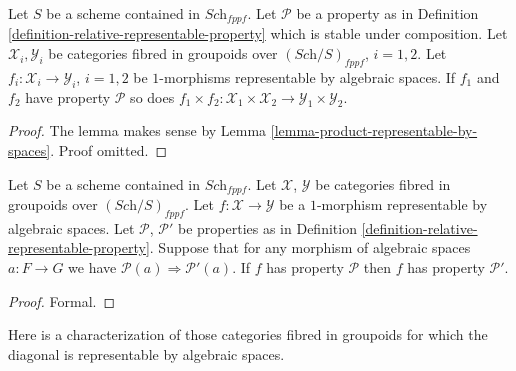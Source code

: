 \begin{lemma}
\label{lemma-product-representable-transformations-property}
Let $S$ be a scheme contained in $\textit{Sch}_{fppf}$.
Let $\mathcal{P}$ be a property as in
Definition \ref{definition-relative-representable-property}
which is stable under composition.
Let $\mathcal{X}_i, \mathcal{Y}_i$ be categories fibred in groupoids over
$(\textit{Sch}/S)_{fppf}$, $i = 1, 2$.
Let $f_i : \mathcal{X}_i \to \mathcal{Y}_i$, $i = 1, 2$
be $1$-morphisms representable by algebraic spaces.
If $f_1$ and $f_2$ have property $\mathcal{P}$ so does
$
f_1 \times f_2 :
\mathcal{X}_1 \times \mathcal{X}_2
\to
\mathcal{Y}_1 \times \mathcal{Y}_2
$.
\end{lemma}

\begin{proof}
The lemma makes sense by
Lemma \ref{lemma-product-representable-by-spaces}.
Proof omitted.
\end{proof}

\begin{lemma}
\label{lemma-representable-transformations-property-implication}
Let $S$ be a scheme contained in $\textit{Sch}_{fppf}$.
Let $\mathcal{X}$, $\mathcal{Y}$ be categories fibred in groupoids
over $(\textit{Sch}/S)_{fppf}$.
Let $f : \mathcal{X} \to \mathcal{Y}$ be a $1$-morphism representable
by algebraic spaces.
Let $\mathcal{P}$, $\mathcal{P}'$ be properties as in
Definition \ref{definition-relative-representable-property}.
Suppose that for any morphism of algebraic spaces $a : F \to G$
we have $\mathcal{P}(a) \Rightarrow \mathcal{P}'(a)$.
If $f$ has property $\mathcal{P}$ then
$f$ has property $\mathcal{P}'$.
\end{lemma}

\begin{proof}
Formal.
\end{proof}

\noindent
Here is a characterization of those categories fibred in groupoids
for which the diagonal is representable by algebraic spaces.

